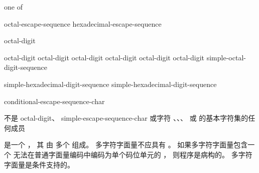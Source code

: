 \begin{bnf}
 \textnormal{one of}\br
\end{bnf}

\begin{bnf}
\br
    octal-escape-sequence\br
    hexadecimal-escape-sequence
\end{bnf}

\begin{bnf}
\br
    octal-digit 
\end{bnf}

\begin{bnf}
\br
    \terminal{\textbackslash} octal-digit\br
    \terminal{\textbackslash} octal-digit octal-digit\br
    \terminal{\textbackslash} octal-digit octal-digit octal-digit\br
     simple-octal-digit-sequence \terminal{\}}
\end{bnf}

\begin{bnf}
\br
     simple-hexadecimal-digit-sequence\br
     simple-hexadecimal-digit-sequence \terminal{\}}
\end{bnf}

\begin{bnf}
\br
    \terminal{\textbackslash} conditional-escape-sequence-char
\end{bnf}

\begin{bnf}
\br
    \textnormal{不是} octal-digit\textnormal{、} simple-escape-sequence-char\textnormal{ 或字符 、、、 或  的基本字符集的任何成员}
\end{bnf}

\pnum
{}%
%
%
%
%
%
%
%
%
%
 是一个 ，
其  由
多个  组成。
多字符字面量不应具有 。
如果多字符字面量包含一个
无法在普通字面量编码中编码为单个码位单元的 ，
则程序是病构的。
多字符字面量是条件支持的。

